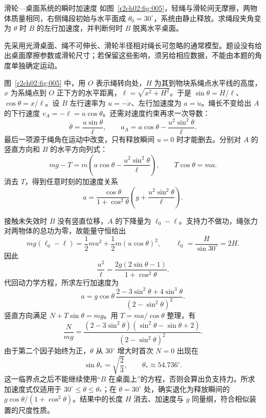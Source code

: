 \begin{practicebox}{滑轮—桌面系统的瞬时加速度}
如图~\ref{r2ch02:fig:005}，轻绳与滑轮间无摩擦，两物体质量相同，右侧绳段初始与水平面成 $\theta_0=30^\circ$，系统由静止释放。求绳段夹角变为 $\theta$ 时 $B$ 的左行加速度，并判断何时 $B$ 脱离水平桌面。
\label{r2ch02:pr:005}
\begin{solution}
先采用光滑桌面、绳不可伸长、滑轮半径相对绳长可忽略的通常模型。题设没有给出桌面摩擦参数或滑轮尺寸；若保留这些影响，须另给相应数据，不能由本题的角度单独确定运动。

图~\ref{r2ch02:fig:005} 中，用 $O$ 表示绳转向处，$H$ 为其到物块系绳点水平线的高度，$x$ 为系绳点到 $O$ 正下方的水平距离，$\ell=\sqrt{x^2+H^2}$。于是 $\sin\theta=H/\ell$、$\cos\theta=x/\ell$。设 $B$ 左行速率为 $u=-\dot x$、左行加速度为 $a=\dot u$。绳长不变给出 $A$ 的下行速度 $v_A=-\dot\ell=u\cos\theta$。还需对速度约束再求一次导数：
\[
 \dot\theta=\frac{u\sin\theta}{\ell},\qquad
 a_A=a\cos\theta-\frac{u^2\sin^2\theta}{\ell}.
\]
最后一项源于绳角在运动中改变，只有释放瞬间 $u=0$ 时才能删去。分别对 $A$ 的竖直方向和 $B$ 的水平方向列式：
\[
 mg-T=m\left(a\cos\theta-\frac{u^2\sin^2\theta}{\ell}\right),
 \qquad T\cos\theta=ma.
\]
消去 $T$，得到任意时刻的加速度关系
\[
 a=\frac{\cos\theta}{1+\cos^2\theta}
       \left(g+\frac{u^2\sin^2\theta}{\ell}\right).
\]
\figPulleyTable

接触未失效时 $B$ 没有竖直位移，$A$ 的下降量为 $\ell_0-\ell$。支持力不做功，绳张力对两物体的总功为零，故能量守恒给出
\[
 mg(\ell_0-\ell)=\frac12mu^2+\frac12m(u\cos\theta)^2,
 \qquad \ell_0=\frac H{\sin30^\circ}=2H.
\]
因此
\[
 \frac{u^2}{\ell}=\frac{2g(2\sin\theta-1)}{1+\cos^2\theta}.
\]
代回动力学方程，所求左行加速度为
\[
 \boxed{a=g\cos\theta\,
 \frac{2-3\sin^2\theta+4\sin^3\theta}{(2-\sin^2\theta)^2}}.
\]
竖直方向满足 $N+T\sin\theta=mg$。用 $T=ma/\cos\theta$ 整理，有
\[
 \frac N{mg}
 =\frac{(2-3\sin^2\theta)(\sin^2\theta-\sin\theta+2)}
        {(2-\sin^2\theta)^2}.
\]
由于第二个因子始终为正，$\theta$ 从 $30^\circ$ 增大时首次 $N=0$ 出现在
\[
 \boxed{\sin\theta_*=\sqrt{\frac23}},\qquad
 \boxed{\theta_*\approx54.736^\circ}.
\]
这一临界点之后不能继续使用“$B$ 在桌面上”的方程，否则会算出负支持力。所求加速度式仅适用于 $30^\circ\leqslant\theta\leqslant\theta_*$；在 $\theta=30^\circ$ 处，确实退化为释放瞬间的 $g\cos\theta/(1+\cos^2\theta)$。结果中的长度 $H$ 消去、加速度与 $g$ 同量纲，符合相似装置的尺度性质。
\end{solution}
\end{practicebox}

